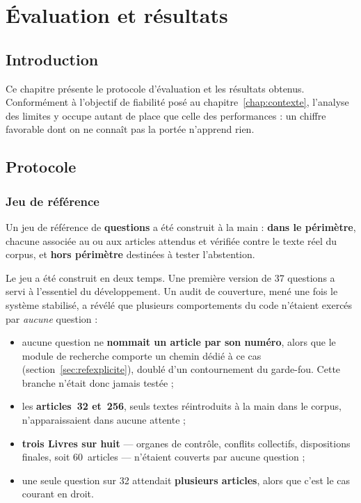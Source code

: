 \chapter{Évaluation et résultats}
\label{chap:evaluation}

\section*{Introduction}

Ce chapitre présente le protocole d'évaluation et les résultats obtenus. Conformément à l'objectif
de fiabilité posé au chapitre~\ref{chap:contexte}, l'analyse des limites y occupe autant de place
que celle des performances : un chiffre favorable dont on ne connaît pas la portée n'apprend rien.

\section{Protocole}

\subsection{Jeu de référence}

Un jeu de référence de \textbf{\NbQuestions{} questions} a été construit à la main :
\textbf{\NbInScope{} dans le périmètre}, chacune associée au ou aux articles attendus et vérifiée
contre le texte réel du corpus, et \textbf{\NbOutScope{} hors périmètre} destinées à tester
l'abstention.

Le jeu a été construit en deux temps. Une première version de 37 questions a servi à l'essentiel
du développement. Un audit de couverture, mené une fois le système stabilisé, a révélé que
plusieurs comportements du code n'étaient exercés par \emph{aucune} question :

\begin{itemize}
  \item aucune question ne \textbf{nommait un article par son numéro}, alors que le module de
        recherche comporte un chemin dédié à ce cas (section~\ref{sec:refexplicite}), doublé d'un
        contournement du garde-fou. Cette branche n'était donc jamais testée ;
  \item les \textbf{articles~32 et~256}, seuls textes réintroduits à la main dans le corpus,
        n'apparaissaient dans aucune attente ;
  \item \textbf{trois Livres sur huit} --- organes de contrôle, conflits collectifs, dispositions
        finales, soit 60~articles --- n'étaient couverts par aucune question ;
  \item une seule question sur 32 attendait \textbf{plusieurs articles}, alors que c'est le cas
        courant en droit.
\end{itemize}

